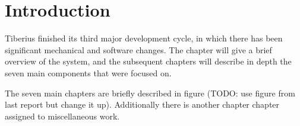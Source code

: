 \section{Introduction}
Tiberius finished its third major development cycle, in which there has been significant mechanical and software changes. The chapter will give a brief overview of the system, and the subsequent chapters will describe in depth the seven main components that were focused on. 

The seven main chapters are briefly described in figure (TODO: use figure from last report but change it up). Additionally there is another chapter chapter assigned to miscellaneous work.
